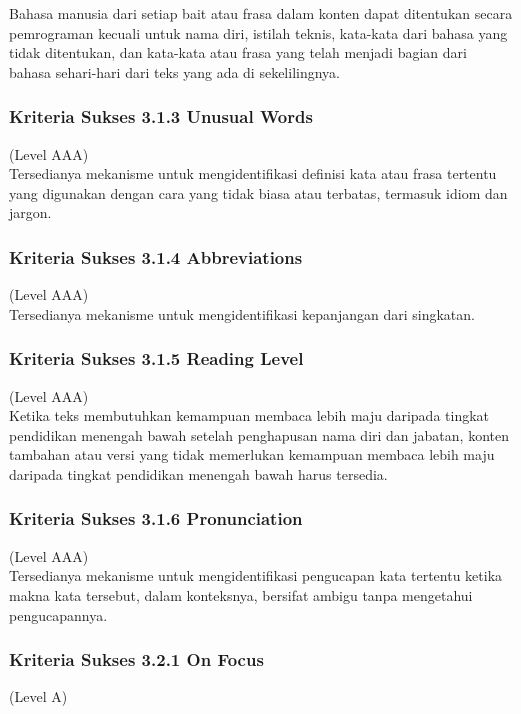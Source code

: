 \documentclass[a4paper,twoside]{article}
\begin{document}
\begin{enumerate}
		Bahasa manusia dari setiap bait atau frasa dalam konten dapat ditentukan secara pemrograman kecuali untuk nama diri, istilah teknis, kata-kata dari bahasa yang tidak ditentukan, dan kata-kata atau frasa yang telah menjadi bagian dari bahasa sehari-hari dari teks yang ada di sekelilingnya.
		
		\subsubsection*{Kriteria Sukses 3.1.3 Unusual Words}
		\label{subsubsec:kriteria_3.1.3}
		(Level AAA) \\
		
		Tersedianya mekanisme untuk mengidentifikasi definisi kata atau frasa tertentu yang digunakan dengan cara yang tidak biasa atau terbatas, termasuk idiom dan jargon.
		
		\subsubsection*{Kriteria Sukses 3.1.4 Abbreviations}
		\label{subsubsec:kriteria_3.1.4}
		(Level AAA) \\
		
		Tersedianya mekanisme untuk mengidentifikasi kepanjangan dari singkatan.
		
		\subsubsection*{Kriteria Sukses 3.1.5 Reading Level}
		\label{subsubsec:kriteria_3.1.5}
		(Level AAA) \\
		
		Ketika teks membutuhkan kemampuan membaca lebih maju daripada tingkat pendidikan menengah bawah setelah penghapusan nama diri dan jabatan, konten tambahan atau versi yang tidak memerlukan kemampuan membaca lebih maju daripada tingkat pendidikan menengah bawah harus tersedia.
		
		\subsubsection*{Kriteria Sukses 3.1.6 Pronunciation}
		\label{subsubsec:kriteria_3.1.6}
		(Level AAA) \\
		
		Tersedianya mekanisme untuk mengidentifikasi pengucapan kata tertentu ketika makna kata tersebut, dalam konteksnya, bersifat ambigu tanpa mengetahui pengucapannya.
		
		\subsubsection*{Kriteria Sukses 3.2.1 On Focus}
		\label{subsubsec:kriteria_3.2.1}
		(Level A) \\
		

\end{enumerate}
\end{document}
